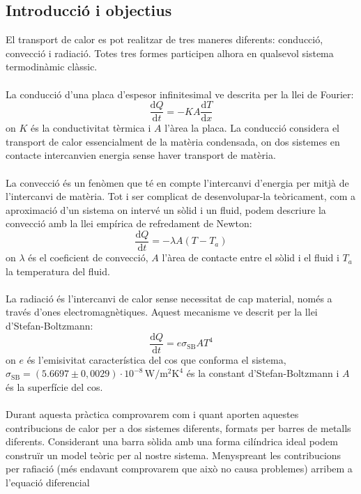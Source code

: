 \documentclass[12pt,twosides,onecolumn,openany]{article}
\begin{document}
\begin{multicols}{2}
\section{Introducció i objectius}
El transport de calor es pot realitzar de tres maneres diferents: conducció, convecció i radiació. Totes tres formes participen alhora en qualsevol sistema termodinàmic clàssic.\\\\
La conducció d'una placa d'espesor infinitesimal ve descrita per la llei de Fourier:
\begin{equation}\label{Fourier}
  \frac{\text{d}Q}{\text{d}t} = -KA \frac{\text{d}T}{\text{d}x}
\end{equation}
on $K$ és la conductivitat tèrmica i $A$ l'àrea la placa. La conducció considera el transport de calor essencialment de la matèria condensada, on dos sistemes en contacte intercanvien energia sense haver transport de matèria.\\\\
La convecció és un fenòmen que té en compte l'intercanvi d'energia per mitjà de l'intercanvi de matèria. Tot i ser complicat de desenvolupar-la teòricament, com a aproximació d'un sistema on intervé un sòlid i un fluid, podem descriure la convecció amb la llei empírica de refredament de Newton:
\begin{equation}\label{Newton}
  \frac{\text{d}Q}{\text{d}t} = -\lambda A(T-T_a)
\end{equation}
on $\lambda$ és el coeficient de convecció, $A$ l'àrea de contacte entre el sòlid i el fluid i $T_a$ la temperatura del fluid.\\\\
La radiació és l'intercanvi de calor sense necessitat de cap material, només a través d'ones electromagnètiques. Aquest mecanisme ve descrit per la llei d'Stefan-Boltzmann:
\begin{equation}\label{Stefan-Boltzmann}
  \frac{\text{d}Q}{\text{d}t} = e\sigma_{\text{SB}}AT^{4}
\end{equation}
on $e$ és l'emisivitat característica del cos que conforma el sistema, \(\sigma_{\text{SB}} = (5.6697\pm0,0029) \cdot10^{-8}\,\text{W}/\text{m}^{2}\text{K}^{4}\) és la constant d'Stefan-Boltzmann i $A$ és la superfície del cos.\\\\
Durant aquesta pràctica comprovarem com i quant aporten aquestes contribucions de calor per a dos sistemes diferents, formats per barres de metalls diferents. Considerant una barra sòlida amb una forma cilíndrica ideal podem construïr un model teòric per al nostre sistema. Menyspreant les contribucions per rafiació (més endavant comprovarem que això no causa problemes) arribem a l'equació diferencial

\end{multicols}
\end{document}
